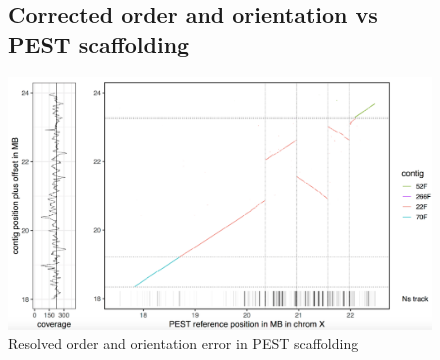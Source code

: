 \begin{figure}[h!]
\subsection{Corrected order and orientation vs PEST scaffolding}
\caption{Resolved order and orientation error in PEST scaffolding}
\label{figure:x_inversion}
\begin{centering}
\includegraphics[width=1.0\textwidth]{x_inversion.png}
\end{centering}
\end{figure}

